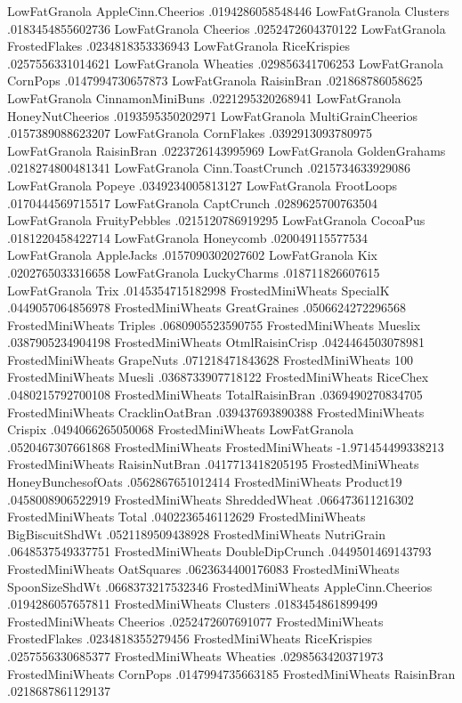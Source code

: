 LowFatGranola	AppleCinn.Cheerios	.0194286058548446
LowFatGranola	Clusters	.0183454855602736
LowFatGranola	Cheerios	.0252472604370122
LowFatGranola	FrostedFlakes	.0234818353336943
LowFatGranola	RiceKrispies	.0257556331014621
LowFatGranola	Wheaties	.029856341706253
LowFatGranola	CornPops	.0147994730657873
LowFatGranola	RaisinBran	.021868786058625
LowFatGranola	CinnamonMiniBuns	.0221295320268941
LowFatGranola	HoneyNutCheerios	.0193595350202971
LowFatGranola	MultiGrainCheerios	.0157389088623207
LowFatGranola	CornFlakes	.0392913093780975
LowFatGranola	RaisinBran	.0223726143995969
LowFatGranola	GoldenGrahams	.0218274800481341
LowFatGranola	Cinn.ToastCrunch	.0215734633929086
LowFatGranola	Popeye	.0349234005813127
LowFatGranola	FrootLoops	.0170444569715517
LowFatGranola	CaptCrunch	.0289625700763504
LowFatGranola	FruityPebbles	.0215120786919295
LowFatGranola	CocoaPus	.0181220458422714
LowFatGranola	Honeycomb	.020049115577534
LowFatGranola	AppleJacks	.0157090302027602
LowFatGranola	Kix	.0202765033316658
LowFatGranola	LuckyCharms	.018711826607615
LowFatGranola	Trix	.0145354715182998
FrostedMiniWheats	SpecialK	.0449057064856978
FrostedMiniWheats	GreatGraines	.0506624272296568
FrostedMiniWheats	Triples	.0680905523590755
FrostedMiniWheats	Mueslix	.0387905234904198
FrostedMiniWheats	OtmlRaisinCrisp	.0424464503078981
FrostedMiniWheats	GrapeNuts	.071218471843628
FrostedMiniWheats	100%
FrostedMiniWheats	Muesli	.0368733907718122
FrostedMiniWheats	RiceChex	.0480215792700108
FrostedMiniWheats	TotalRaisinBran	.0369490270834705
FrostedMiniWheats	CracklinOatBran	.039437693890388
FrostedMiniWheats	Crispix	.0494066265050068
FrostedMiniWheats	LowFatGranola	.0520467307661868
FrostedMiniWheats	FrostedMiniWheats	-1.971454499338213
FrostedMiniWheats	RaisinNutBran	.0417713418205195
FrostedMiniWheats	HoneyBunchesofOats	.0562867651012414
FrostedMiniWheats	Product19	.0458008906522919
FrostedMiniWheats	ShreddedWheat	.066473611216302
FrostedMiniWheats	Total	.0402236546112629
FrostedMiniWheats	BigBiscuitShdWt	.0521189509438928
FrostedMiniWheats	NutriGrain	.0648537549337751
FrostedMiniWheats	DoubleDipCrunch	.0449501469143793
FrostedMiniWheats	OatSquares	.0623634400176083
FrostedMiniWheats	SpoonSizeShdWt	.0668373217532346
FrostedMiniWheats	AppleCinn.Cheerios	.0194286057657811
FrostedMiniWheats	Clusters	.0183454861899499
FrostedMiniWheats	Cheerios	.0252472607691077
FrostedMiniWheats	FrostedFlakes	.0234818355279456
FrostedMiniWheats	RiceKrispies	.0257556330685377
FrostedMiniWheats	Wheaties	.0298563420371973
FrostedMiniWheats	CornPops	.0147994735663185
FrostedMiniWheats	RaisinBran	.0218687861129137
